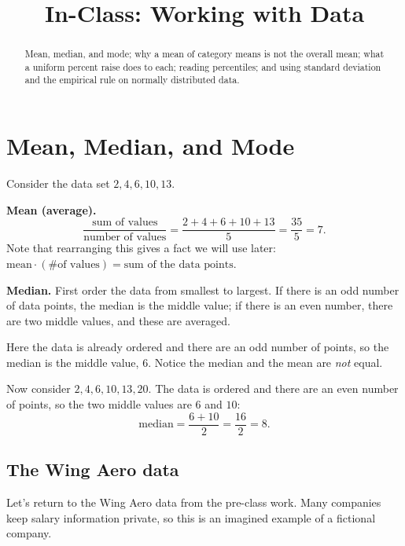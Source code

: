 \documentclass[12pt]{ximera}
\title{In-Class: Working with Data}
\begin{document}
\begin{abstract}
Mean, median, and mode; why a mean of category means is not the overall mean; what a
uniform percent raise does to each; reading percentiles; and using standard deviation
and the empirical rule on normally distributed data.
\end{abstract}
\maketitle

\section*{Mean, Median, and Mode}

\begin{example}
Consider the data set $2, 4, 6, 10, 13$.

\textbf{Mean (average).}
\[
\frac{\text{sum of values}}{\text{number of values}}
= \frac{2 + 4 + 6 + 10 + 13}{5} = \frac{35}{5} = 7.
\]
Note that rearranging this gives a fact we will use later:
$\text{mean} \cdot (\text{\# of values}) = \text{sum of the data points}$.

\textbf{Median.} First order the data from smallest to largest. If there is an odd
number of data points, the median is the middle value; if there is an even number,
there are two middle values, and these are averaged.

Here the data is already ordered and there are an odd number of points, so the median
is the middle value, $6$. Notice the median and the mean are \emph{not} equal.
\end{example}

\begin{example}
Now consider $2, 4, 6, 10, 13, 20$. The data is ordered and there are an even number
of points, so the two middle values are $6$ and $10$:
\[
\text{median} = \frac{6 + 10}{2} = \frac{16}{2} = 8.
\]
\end{example}

\subsection*{The Wing Aero data}

Let's return to the Wing Aero data from the pre-class work. Many companies keep
salary information private, so this is an imagined example of a fictional company.

\end{document}
